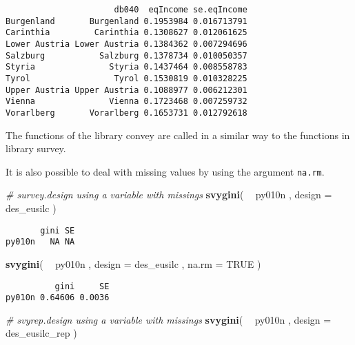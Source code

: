 \documentclass[]{book}
\newenvironment{Shaded}{\begin{snugshade}}{\end{snugshade}}
\newcommand{\CommentTok}[1]{\textcolor[rgb]{0.56,0.35,0.01}{\textit{#1}}}
\newcommand{\DataTypeTok}[1]{\textcolor[rgb]{0.13,0.29,0.53}{#1}}
\newcommand{\KeywordTok}[1]{\textcolor[rgb]{0.13,0.29,0.53}{\textbf{#1}}}
\newcommand{\NormalTok}[1]{#1}
\newcommand{\OperatorTok}[1]{\textcolor[rgb]{0.81,0.36,0.00}{\textbf{#1}}}
\newcommand{\OtherTok}[1]{\textcolor[rgb]{0.56,0.35,0.01}{#1}}
\newcommand{\StringTok}[1]{\textcolor[rgb]{0.31,0.60,0.02}{#1}}
\begin{document}
\begin{verbatim}
                      db040  eqIncome se.eqIncome
Burgenland       Burgenland 0.1953984 0.016713791
Carinthia         Carinthia 0.1308627 0.012061625
Lower Austria Lower Austria 0.1384362 0.007294696
Salzburg           Salzburg 0.1378734 0.010050357
Styria               Styria 0.1437464 0.008558783
Tyrol                 Tyrol 0.1530819 0.010328225
Upper Austria Upper Austria 0.1088977 0.006212301
Vienna               Vienna 0.1723468 0.007259732
Vorarlberg       Vorarlberg 0.1653731 0.012792618
\end{verbatim}

The functions of the library convey are called in a similar way to the functions in library survey.

It is also possible to deal with missing values by using the argument \texttt{na.rm}.

\begin{Shaded}
\begin{Highlighting}[]
\CommentTok{# survey.design using a variable with missings}
\KeywordTok{svygini}\NormalTok{( }\OperatorTok{~}\StringTok{ }\NormalTok{py010n , }\DataTypeTok{design =}\NormalTok{ des_eusilc )}
\end{Highlighting}
\end{Shaded}

\begin{verbatim}
       gini SE
py010n   NA NA
\end{verbatim}

\begin{Shaded}
\begin{Highlighting}[]
\KeywordTok{svygini}\NormalTok{( }\OperatorTok{~}\StringTok{ }\NormalTok{py010n , }\DataTypeTok{design =}\NormalTok{ des_eusilc , }\DataTypeTok{na.rm =} \OtherTok{TRUE}\NormalTok{ )}
\end{Highlighting}
\end{Shaded}

\begin{verbatim}
          gini     SE
py010n 0.64606 0.0036
\end{verbatim}

\begin{Shaded}
\begin{Highlighting}[]
\CommentTok{# svyrep.design using a variable with missings}
\KeywordTok{svygini}\NormalTok{( }\OperatorTok{~}\StringTok{ }\NormalTok{py010n , }\DataTypeTok{design =}\NormalTok{ des_eusilc_rep )}
\end{Highlighting}
\end{Shaded}
\end{document}
